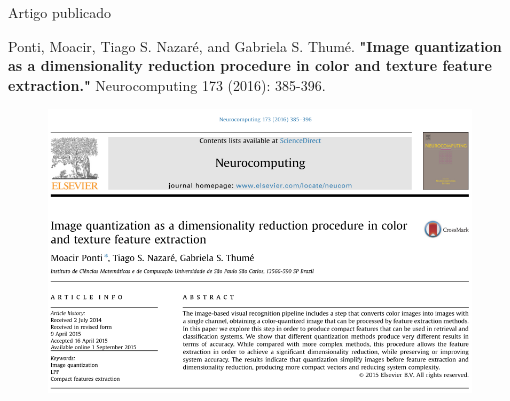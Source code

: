 \documentclass[10pt]{beamer}
\begin{document}
\begin{frame}{Artigo publicado}
  \setlength\leftmargini{1em}

  \begin{block}{}
        \tiny{
      Ponti, Moacir, Tiago S. Nazaré, and Gabriela S. Thumé. \textbf{"Image quantization as a dimensionality reduction procedure in color and texture feature extraction."} Neurocomputing 173 (2016): 385-396.
    }
  \end{block}
  \begin{figure}
    \begin{center}
      \includegraphics[width=0.7\linewidth]{figuras/artigo.png}
    \end{center}
  \end{figure}
\end{frame}
\end{document}
